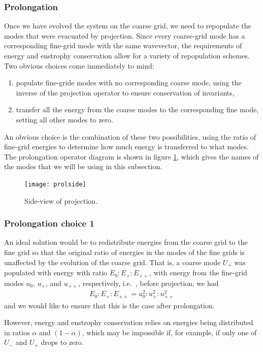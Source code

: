 \documentclass[10pt,showpacs,showkeys,%
amsfonts,amsmath,
onecolumn,
floatfix,aps,superscriptaddress]{revtex4}
\begin{document}
\subsubsection{Prolongation}
Once we have evolved the system on the coarse grid, 
we need to repopulate the modes that were evacuated by projection.
Since every coarse-grid mode has a corresponding fine-grid mode with
the same wavevector, the requirements of energy and enstrophy conservation
allow for a variety of repopulation schemes. 
Two obvious choices come immediately to mind:
\begin{enumerate}
\item
populate fine-gride modes with no corresponding coarse mode, using the inverse
of the projection operator to ensure conservation of invariants, 
\item
transfer all the energy from the coarse modes to the corresponding fine 
mode, setting all other modes to zero.
\end{enumerate}
An obvious choice is the combination of these two possibilities, using 
the ratio of fine-grid energies to determine how much energy is transferred
to what modes. The prolongation operator diagram is shown in figure 
\ref{prolside}, which gives the names of the modes that we will be using
in this subsection.
\begin{figure}[htb]
  \begin{center}
    \texttt{[image: prolside]}
    \caption{Side-view of projection.}
    \label{prolside}
  \end{center}
\end{figure}

\subsubsection{Prolongation choice 1}
An ideal solution would be to redistribute energies from the coarse grid
to the fine grid so that the original ratio of energies in the modes
of the fine grids is unaffected by the evolution of the coarse grid.
That is, a coarse mode $U_+$ was populated with energy with ratio 
$E_0:E_+:E_{++}$, with energy from the fine-grid modes $u_0$, $u_+$, 
and $u_{++}$, respectively, i.e.\ , before projection, we had
\begin{eqnarray}
  E_0:E_+:E_{++} = u_0^2: u_+^2: u_{++}^2
\end{eqnarray}
and we would like to ensure that this is the case after prolongation. 

However, energy and enstrophy conservation relies on energies being 
distributed in ratios $\alpha$ and $(1-\alpha)$, which may be impossible if,
for example, if only one of $U_-$ and $U_+$ drops to zero.
\end{document}
